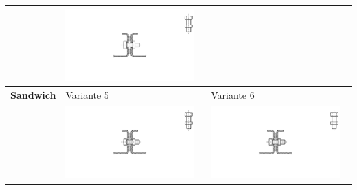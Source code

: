 \begin{longtable}{l p{6.55cm} p{6.55cm}}
\begin{minipage}{6.5cm}
        \end{minipage} &
        \noindent\begin{minipage}{6.5cm}
                \includegraphics[page=4, width=0.95\textwidth, trim = 12cm 6cm 12cm 5.5cm, clip]{Abbildungen/Kapitel3/Konzepte.pdf}
        \end{minipage} \\
    \midrule
         \textbf{Sandwich} & Variante 5 & Variante 6 \\ \nopagebreak 
         & \noindent\begin{minipage}{6.5cm}
                \includegraphics[page=5, width=0.95\textwidth, trim = 12.5cm 6cm 12cm 6cm, clip]{Abbildungen/Kapitel3/Konzepte.pdf}
        \end{minipage} &
        \noindent\begin{minipage}{6.5cm}
                \includegraphics[page=6, width=0.95\textwidth, trim = 14cm 7cm 10cm 7cm, clip]{Abbildungen/Kapitel3/Konzepte.pdf}

\end{minipage}
\end{longtable}
